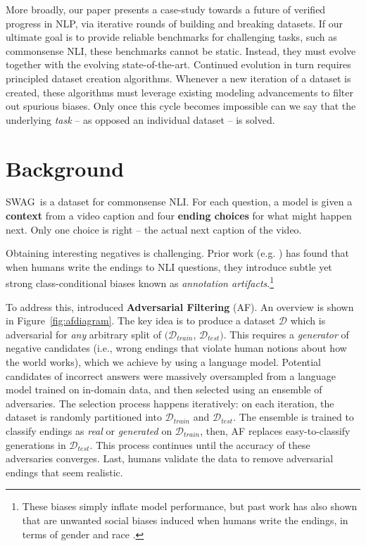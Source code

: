 More broadly, our paper presents a case-study towards a future of verified progress in NLP, via iterative rounds of building and breaking datasets. If our ultimate goal is to provide reliable benchmarks for challenging tasks, such as commonsense NLI, these benchmarks cannot be static. Instead, they must evolve together with the evolving state-of-the-art. Continued evolution in turn requires principled dataset creation algorithms. Whenever a new iteration of a dataset is created, these algorithms must leverage existing modeling advancements to filter out spurious biases. Only once this cycle becomes impossible can we say that the underlying \emph{task} -- as opposed an individual dataset -- is solved. 

\section{Background}

{SWAG}~is a dataset for commonsense NLI. For each question, a model is given a \textbf{context} from a video caption and four \textbf{ending choices} for what might happen next. Only one choice is right -- the actual next caption of the video.

Obtaining interesting negatives is challenging. Prior work (e.g. \citealp{gururangan2018annotation,poliak_hypothesis_2018}) has found that when humans write the endings to NLI questions, they introduce subtle yet strong class-conditional biases known as \emph{annotation artifacts}.\footnote{These biases simply inflate model performance, but past work has also shown that are unwanted social biases induced when humans write the endings, in terms of gender and race \cite{rudinger_learning_2015}.}

To address this, \citet{zellers2018swagaf} introduced \textbf{Adversarial Filtering} (AF). An overview is shown in Figure~\ref{fig:afdiagram}. The key idea is to produce a dataset $\mathcal{D}$ which is adversarial for \emph{any} arbitrary split of $(\mathcal{D}_{train}$, $\mathcal{D}_{test})$. 
This requires a \emph{generator} of negative candidates (i.e., wrong endings that violate human notions about how the world works), which we achieve by using a language model. Potential candidates of incorrect answers were massively oversampled from a language model trained on in-domain data, and then selected using an ensemble of adversaries. The selection process happens iteratively: on each iteration, the dataset is randomly partitioned into $\mathcal{D}_{train}$ and $\mathcal{D}_{test}$. The ensemble is trained to classify endings as \emph{real} or \emph{generated} on $\mathcal{D}_{train}$, then, AF replaces easy-to-classify generations in $\mathcal{D}_{test}$. This process continues until the accuracy of these adversaries converges. Last, humans validate the data to remove adversarial endings that seem realistic.


